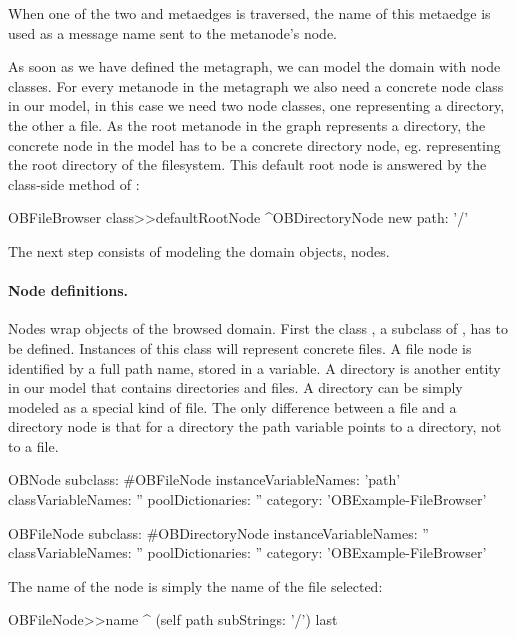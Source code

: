 \documentclass[a4paper,10pt,twoside]{book}
\begin{document}
When one of the two  and  metaedges is traversed, the name of this metaedge is used as a message name sent to the metanode's node.

As soon as we have defined the metagraph, we can model the domain with node classes. For every metanode in the metagraph we also need a concrete node class in our model, in this case we need two node classes, one representing a directory, the other a file. As the root metanode in the graph represents a directory, the concrete node in the model has to be a concrete directory node, eg. representing the root directory of the filesystem. This default root node is answered by the class-side method  of : 
                    
\begin{code}{}    
OBFileBrowser class>>defaultRootNode
     ^OBDirectoryNode new path: '/'
\end{code}

The next step consists of modeling the domain objects, \ie nodes.

\paragraph{Node definitions.} Nodes wrap objects of the browsed domain. First the class , a subclass of , has to be defined. Instances of this class will represent concrete files. A file node is identified by a full path name, stored in a variable. A directory is another entity in our model that contains directories and files. A directory can be simply modeled as a special kind of file. The only difference between a file and a directory node is that for a directory the path variable points to a directory, not to a file. 

\begin{code}{}
OBNode subclass: #OBFileNode
     instanceVariableNames: 'path'
     classVariableNames: ''
     poolDictionaries: ''
     category: 'OBExample-FileBrowser'

OBFileNode subclass: #OBDirectoryNode
     instanceVariableNames: ''
     classVariableNames: ''
     poolDictionaries: ''
     category: 'OBExample-FileBrowser'
\end{code}

The name of the node is simply the name of the file selected:

\begin{code}{}
OBFileNode>>name
     ^ (self path subStrings: '/') last
\end{code}
\end{document}
